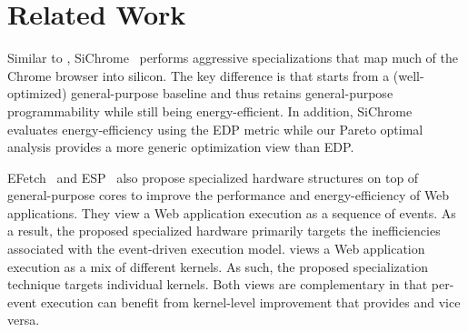 \section{Related Work}
\label{sec:arch:related}

Similar to \webcore, SiChrome~\cite{SiChrome} performs aggressive specializations that map much of the Chrome browser into silicon. The key difference is that \webcore starts from a (well-optimized) general-purpose baseline and thus retains general-purpose programmability while still being energy-efficient. In addition, SiChrome evaluates energy-efficiency using the EDP metric while our Pareto optimal analysis provides a more generic optimization view than EDP.

EFetch~\cite{efetch} and ESP~\cite{esp} also propose specialized hardware structures on top of general-purpose cores to improve the performance and energy-efficiency of Web applications. They view a Web application execution as a sequence of events. As a result, the proposed specialized hardware primarily targets the inefficiencies associated with the event-driven execution model. \webcore views a Web application execution as a mix of different kernels. As such, the proposed specialization technique targets individual kernels. Both views are complementary in that per-event execution can benefit from kernel-level improvement that \webcore provides and vice versa.

